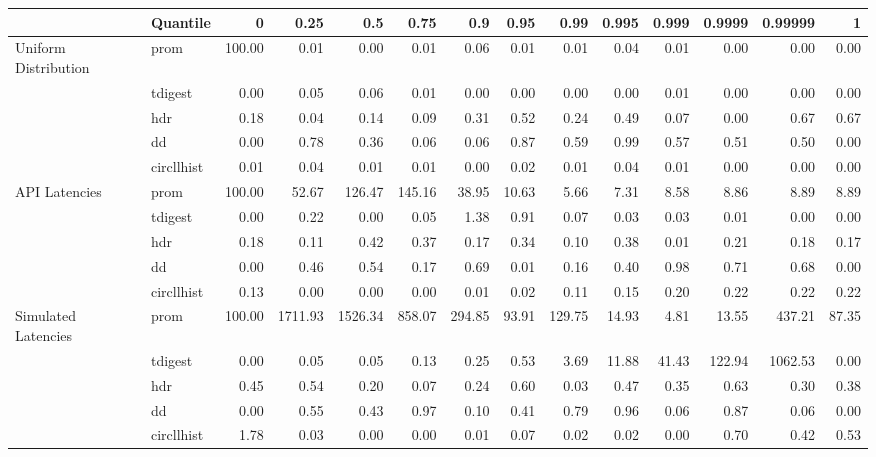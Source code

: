 \begin{tabular}{llrrrrrrrrrrrr}
\toprule
                    & Quantile &      0 &    0.25 &     0.5 &   0.75 &    0.9 &  0.95 &   0.99 &  0.995 &  0.999 &  0.9999 &  0.99999 &     1 \\
\midrule
Uniform Distribution & prom & 100.00 &    0.01 &    0.00 &   0.01 &   0.06 &  0.01 &   0.01 &   0.04 &   0.01 &    0.00 &     0.00 &  0.00 \\
                    & tdigest &   0.00 &    0.05 &    0.06 &   0.01 &   0.00 &  0.00 &   0.00 &   0.00 &   0.01 &    0.00 &     0.00 &  0.00 \\
                    & hdr &   0.18 &    0.04 &    0.14 &   0.09 &   0.31 &  0.52 &   0.24 &   0.49 &   0.07 &    0.00 &     0.67 &  0.67 \\
                    & dd &   0.00 &    0.78 &    0.36 &   0.06 &   0.06 &  0.87 &   0.59 &   0.99 &   0.57 &    0.51 &     0.50 &  0.00 \\
                    & circllhist &   0.01 &    0.04 &    0.01 &   0.01 &   0.00 &  0.02 &   0.01 &   0.04 &   0.01 &    0.00 &     0.00 &  0.00 \\
API Latencies & prom & 100.00 &   52.67 &  126.47 & 145.16 &  38.95 & 10.63 &   5.66 &   7.31 &   8.58 &    8.86 &     8.89 &  8.89 \\
                    & tdigest &   0.00 &    0.22 &    0.00 &   0.05 &   1.38 &  0.91 &   0.07 &   0.03 &   0.03 &    0.01 &     0.00 &  0.00 \\
                    & hdr &   0.18 &    0.11 &    0.42 &   0.37 &   0.17 &  0.34 &   0.10 &   0.38 &   0.01 &    0.21 &     0.18 &  0.17 \\
                    & dd &   0.00 &    0.46 &    0.54 &   0.17 &   0.69 &  0.01 &   0.16 &   0.40 &   0.98 &    0.71 &     0.68 &  0.00 \\
                    & circllhist &   0.13 &    0.00 &    0.00 &   0.00 &   0.01 &  0.02 &   0.11 &   0.15 &   0.20 &    0.22 &     0.22 &  0.22 \\
Simulated Latencies & prom & 100.00 & 1711.93 & 1526.34 & 858.07 & 294.85 & 93.91 & 129.75 &  14.93 &   4.81 &   13.55 &   437.21 & 87.35 \\
                    & tdigest &   0.00 &    0.05 &    0.05 &   0.13 &   0.25 &  0.53 &   3.69 &  11.88 &  41.43 &  122.94 &  1062.53 &  0.00 \\
                    & hdr &   0.45 &    0.54 &    0.20 &   0.07 &   0.24 &  0.60 &   0.03 &   0.47 &   0.35 &    0.63 &     0.30 &  0.38 \\
                    & dd &   0.00 &    0.55 &    0.43 &   0.97 &   0.10 &  0.41 &   0.79 &   0.96 &   0.06 &    0.87 &     0.06 &  0.00 \\
                    & circllhist &   1.78 &    0.03 &    0.00 &   0.00 &   0.01 &  0.07 &   0.02 &   0.02 &   0.00 &    0.70 &     0.42 &  0.53 \\
\bottomrule
\end{tabular}
